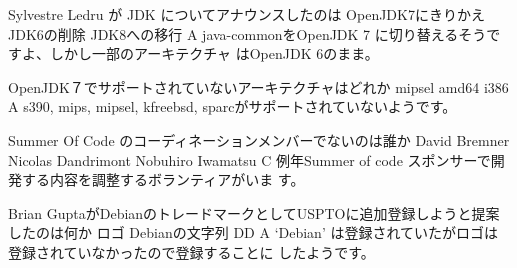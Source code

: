 %

\santaku
{Sylvestre Ledru が JDK についてアナウンスしたのは}
{OpenJDK7にきりかえ}
{JDK6の削除}
{JDK8への移行}
{A}
{java-commonをOpenJDK 7 に切り替えるそうですよ、しかし一部のアーキテクチャ
はOpenJDK 6のまま。}

\santaku
{OpenJDK７でサポートされていないアーキテクチャはどれか}
{mipsel}
{amd64}
{i386}
{A}
{s390, mips, mipsel, kfreebsd, sparcがサポートされていないようです。}

\santaku
{Summer Of Code のコーディネーションメンバーでないのは誰か}
{David Bremner}
{Nicolas Dandrimont}
{Nobuhiro Iwamatsu}
{C}
{例年Summer of code スポンサーで開発する内容を調整するボランティアがいま
す。}

\santaku
{Brian GuptaがDebianのトレードマークとしてUSPTOに追加登録しようと提案したのは何か}
{ロゴ}
{Debianの文字列}
{DD}
{A}
{`Debian' は登録されていたがロゴは登録されていなかったので登録することに
したようです。}

